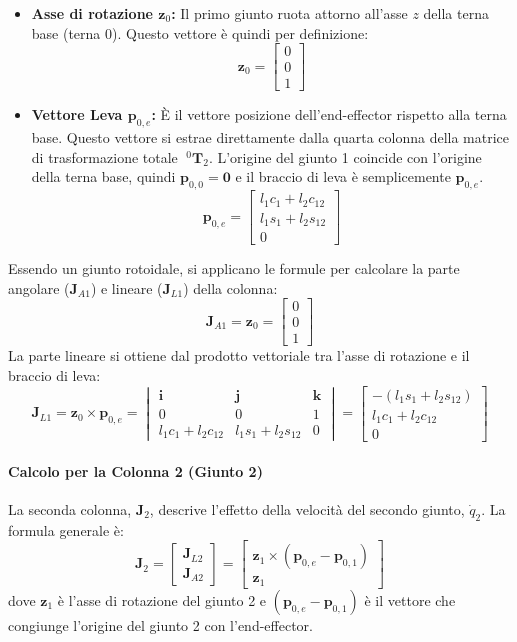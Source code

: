 ﻿\documentclass[11pt, a4paper]{article}
\begin{document}
\begin{itemize}
    \item \textbf{Asse di rotazione \(\bm{z}_0\):} Il primo giunto ruota attorno all'asse \(z\) della terna base (terna 0). Questo vettore è quindi per definizione:
    \[ \bm{z}_0 = \begin{bmatrix} 0 \\ 0 \\ 1 \end{bmatrix} \]
    \item \textbf{Vettore Leva \(\bm{p}_{0,e}\):} È il vettore posizione dell'end-effector rispetto alla terna base. Questo vettore si estrae direttamente dalla quarta colonna della matrice di trasformazione totale \(\;^{0}{\bm{T}}_2\). L'origine del giunto 1 coincide con l'origine della terna base, quindi \(\bm{p}_{0,0} = \bm{0}\) e il braccio di leva è semplicemente \(\bm{p}_{0,e}\).
    \[ \bm{p}_{0,e} = \begin{bmatrix} l_1 c_1 + l_2 c_{12} \\ l_1 s_1 + l_2 s_{12} \\ 0 \end{bmatrix} \]
\end{itemize}
Essendo un giunto rotoidale, si applicano le formule per calcolare la parte angolare (\(\bm{J}_{A1}\)) e lineare (\(\bm{J}_{L1}\)) della colonna:
\[
    \bm{J}_{A1} = \bm{z}_0 = \begin{bmatrix} 0 \\ 0 \\ 1 \end{bmatrix}
\]
La parte lineare si ottiene dal prodotto vettoriale tra l'asse di rotazione e il braccio di leva:
\[
    \bm{J}_{L1} = \bm{z}_0 \times \bm{p}_{0,e} =
    \begin{vmatrix}
        \bm{i} & \bm{j} & \bm{k} \\
        0 & 0 & 1 \\
        l_1 c_1 + l_2 c_{12} & l_1 s_1 + l_2 s_{12} & 0
    \end{vmatrix}
    = \begin{bmatrix} -(l_1 s_1 + l_2 s_{12}) \\ l_1 c_1 + l_2 c_{12} \\ 0 \end{bmatrix}
\]

\paragraph{Calcolo per la Colonna 2 (Giunto 2)}
La seconda colonna, \(\bm{J}_2\), descrive l'effetto della velocità del secondo giunto, \(\dot{q}_2\). La formula generale è:
\[ \bm{J}_2 = \begin{bmatrix} \bm{J}_{L2} \\ \bm{J}_{A2} \end{bmatrix} = \begin{bmatrix} \bm{z}_1 \times (\bm{p}_{0,e} - \bm{p}_{0,1}) \\ \bm{z}_1 \end{bmatrix} \]
dove \(\bm{z}_1\) è l'asse di rotazione del giunto 2 e \((\bm{p}_{0,e} - \bm{p}_{0,1})\) è il vettore che congiunge l'origine del giunto 2 con l'end-effector.
\end{document}

